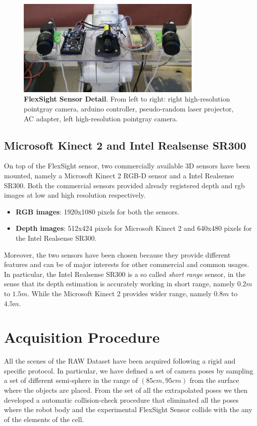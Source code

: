 \begin{figure}
    \centering
    \includegraphics[width=0.8\textwidth]{figures/3_raw_dataset/fs_sensor_0}
    \caption{\textbf{FlexSight Sensor Detail}. From left to right: right high-resolution pointgray camera, arduino controller, pseudo-random laser projector, AC adapter, left high-resolution pointgray camera.}
    \label{fig:fs_sensor_0}
\end{figure}

\subsection{Microsoft Kinect 2 and Intel Realsense SR300}\label{subsec:raw_setup_kin&realsense}
On top of the FlexSight sensor, two commercially available 3D sensors have been mounted, namely a Microsoft Kinect 2 RGB-D sensor and a Intel Realsense SR300. Both the commercial sensors provided already registered depth and rgb images at low and high resolution respectively.

\begin{itemize}
	\item \textbf{RGB images}: 1920x1080 pixels for both the sensors.
	\item \textbf{Depth images}: 512x424 pixels for Microsoft Kinect 2 and 640x480 pixels for the Intel Realsense SR300.
\end{itemize}

Moreover, the two sensors have been chosen because they provide different features and can be of major interests for other commercial and common usages. In particular, the Intel Realsense SR300 is a so called \emph{short range} sensor, in the sense that its depth estimation is accurately working in short range, namely $0.2m$ to $1.5m$. While the Microsoft Kinect 2 provides wider range, namely $0.8m$ to $4.5m$.

\section{Acquisition Procedure}\label{sec:raw_acquisition_procedure}
All the scenes of the RAW Dataset have been acquired following a rigid and specific protocol. In particular, we have defined a set of camera poses by sampling a set of different semi-sphere in the range of $(85cm, 95cm)$ from the surface where the objects are placed. From the set of all the extrapolated poses we then developed a automatic collision-check procedure that eliminated all the poses where the robot body and the experimental FlexSight Sensor collide with the any of the elements of the cell.

